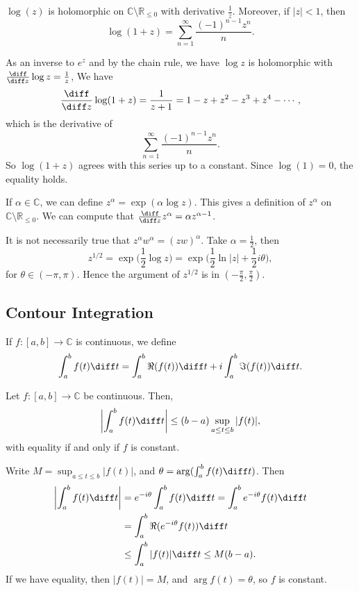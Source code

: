 \documentclass[12pt]{article}
\begin{document}
\begin{proposition}
	$\log(z)$ is holomorphic on $\mathbb{C}\setminus \mathbb{R}_{\leq 0}$ with derivative $\frac{1}{z}$. Moreover, if $|z| < 1$, then
	\[
	\log(1+z) = \sum_{n = 1}^{\infty} \frac{(-1)^{n-1} z^{n}}{n}
	.\]
\end{proposition}

\begin{proofbox}
	As an inverse to $e^{z}$ and by the chain rule, we have $\log z$ is holomorphic with $\frac{\diff}{\diff z}\log z = \frac{1}{z}$, We have
	\[
	\frac{\diff}{\diff z} \log (1 + z) = \frac{1}{z+1} = 1 - z + z^2 - z^3 + z^{4} - \cdots
	,\]
	which is the derivative of
	\[
	\sum_{n = 1}^{\infty} \frac{(-1)^{n-1} z^{n}}{n}
	.\]
	So $\log(1+z)$ agrees with this series up to a constant. Since $\log(1) = 0$, the equality holds.
\end{proofbox}

If $\alpha \in \mathbb{C}$, we can define $z^{\alpha} = \exp(\alpha \log z)$. This gives a definition of $z^{\alpha}$ on $\mathbb{C}\setminus \mathbb{R}_{\leq 0}$. We can compute that $\frac{\diff}{\diff z} z^{\alpha} = \alpha z^{\alpha - 1}$.

It is not necessarily true that $z^{\alpha}w^{\alpha} = (zw)^{\alpha}$. Take $\alpha = \frac{1}{2}$, then
\[
z^{1/2} = \exp \biggl( \frac{1}{2} \log z \biggr) = \exp \biggl( \frac{1}{2} \ln|z| + \frac{1}{2} i \theta \biggr)
,\]
for $\theta \in (-\pi, \pi)$. Hence the argument of $z^{1/2}$ is in $(-\frac{\pi}{2}, \frac{\pi}{2})$.

\subsection{Contour Integration}
\label{sub:contour_integration}

If $f : [a, b] \to \mathbb{C}$ is continuous, we define
\[
\int_{a}^{b} f(t) \diff t = \int_{a}^{b} \Re(f(t)) \diff t + i \int_{a}^{b} \Im(f(t)) \diff t
.\]

\begin{proposition}
	Let $f : [a, b] \to \mathbb{C}$ be continuous. Then,
	\[
	\biggl| \int_{a}^{b} f(t) \diff t \biggr| \leq (b - a)\sup_{a \leq t \leq b} |f(t)|
	,\]
	with equality if and only if $f$ is constant.
\end{proposition}

\begin{proofbox}
	Write $M = \sup_{a \leq t \leq b}|f(t)|$, and $\theta = \arg(\int_{a}^{b} f(t) \diff t)$. Then
	\begin{align*}
		\biggl| \int_{a}^{b}f(t) \diff t \biggr| &= e^{-i \theta} \int_{a}^{b} f(t) \diff t = \int_{a}^{b} e^{-i \theta} f(t) \diff t \\
							 &= \int_{a}^{b} \Re(e^{-i \theta}f(t)) \diff t \\
							 &\leq \int_{a}^{b} |f(t)| \diff t \leq M(b - a).
	\end{align*}
	If we have equality, then $|f(t)| = M$, and $\arg f(t) = \theta$, so $f$ is constant.
\end{proofbox}
\end{document}
